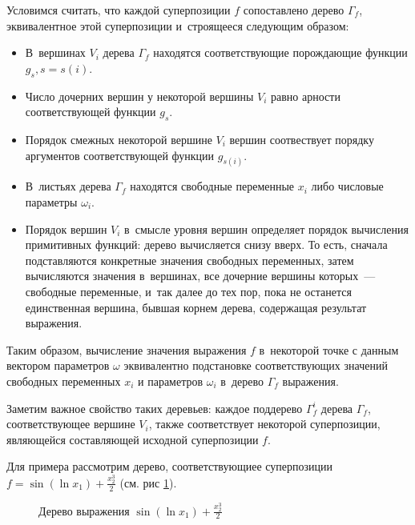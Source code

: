 \documentclass[12pt,a4paper]{article}
\begin{document}
Условимся считать, что каждой суперпозиции $f$ сопоставлено дерево $\Gamma_f$,
эквивалентное этой суперпозиции и~строящееся следующим образом:

\begin{itemize}
  \item В~вершинах $V_i$ дерева $\Gamma_f$ находятся соответствующие
	порождающие функции $g_s, s = s(i)$.
  \item Число дочерних вершин у некоторой вершины $V_i$ равно арности
	соответствующей функции $g_s$.
  \item Порядок смежных некоторой вершине $V_i$ вершин соотвествует порядку
	аргументов соответствующей функции $g_{s(i)}$.
  \item В~листьях дерева $\Gamma_f$ находятся свободные переменные $x_i$
	либо числовые параметры $\omega_i$.
  \item Порядок вершин $V_i$ в~смысле уровня вершин определяет порядок
	вычисления примитивных функций: дерево вычисляется снизу вверх.
	То есть, сначала подставляются конкретные значения свободных переменных,
	затем вычисляются значения в~вершинах, все дочерние вершины которых~---
	свободные переменные, и~так далее до тех пор, пока не останется
	единственная вершина, бывшая корнем дерева, содержащая результат выражения.
\end{itemize}

Таким образом, вычисление значения выражения $f$ в~некоторой точке с данным
вектором параметров $\omega$ эквивалентно подстановке соответствующих
значений свободных переменных $x_i$ и параметров $\omega_i$ в~дерево
$\Gamma_f$ выражения.

Заметим важное свойство таких деревьев: каждое поддерево $\Gamma_f^i$
дерева $\Gamma_f$, соответствующее вершине $V_i$, также соответствует
некоторой суперпозиции, являющейся составляющей исходной суперпозиции $f$.

Для примера рассмотрим дерево, соответствующиее суперпозиции
$f = \sin (\ln x_1) + \frac{x_2^3}{2}$ (см. рис \ref{fig:expr_tree_example}).

\begin{figure}[h]
  \caption{Дерево выражения $\sin (\ln x_1) + \frac{x_2^3}{2}$}
  \label{fig:expr_tree_example}
\end{figure}
\end{document}
